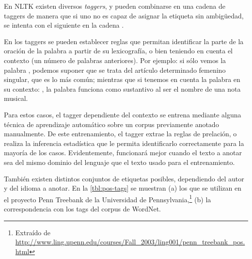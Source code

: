 En NLTK existen diversos \emph{taggers}, y pueden combinarse en una cadena de taggers de manera que si uno no es capaz de asignar la etiqueta sin ambigüedad, se intenta con el siguiente en la cadena \citep{Perkins2010}.

En los taggers se pueden establecer reglas que permitan identificar la parte de la oración de la palabra a partir de su lexicografía, o bien teniendo en cuenta el contexto (un número de palabras anteriores). Por ejemplo: si sólo vemos la palabra , podemos suponer que se trata del artículo determinado femenino singular, que es lo más común; mientras que si tenemos en cuenta la palabra en su contexto: , la palabra  funciona como sustantivo al ser el nombre de una nota musical.

Para estos casos, el tagger dependiente del contexto se entrena mediante alguna técnica de aprendizaje automático sobre un corpus previamente anotado manualmente. De este entrenamiento, el tagger extrae la reglas de prelación, o realiza la inferencia estadística que le permita identificarlo correctamente para la mayoría de los casos. Evidentemente, funcionará mejor cuando el texto a anotar sea del mismo dominio del lenguaje que el texto usado para el entrenamiento.

También existen distintos conjuntos de etiquetas posibles, dependiendo del autor y del idioma a anotar. En la \autoref{tbl:pos-tags} se muestran (a) los que se utilizan en el proyecto Penn Treebank de la Universidad de Pennsylvania,\footnote{Extraído de \url{http://www.ling.upenn.edu/courses/Fall_2003/ling001/penn_treebank_pos.html}} (b) la correspondencia con los tags del corpus de WordNet.

